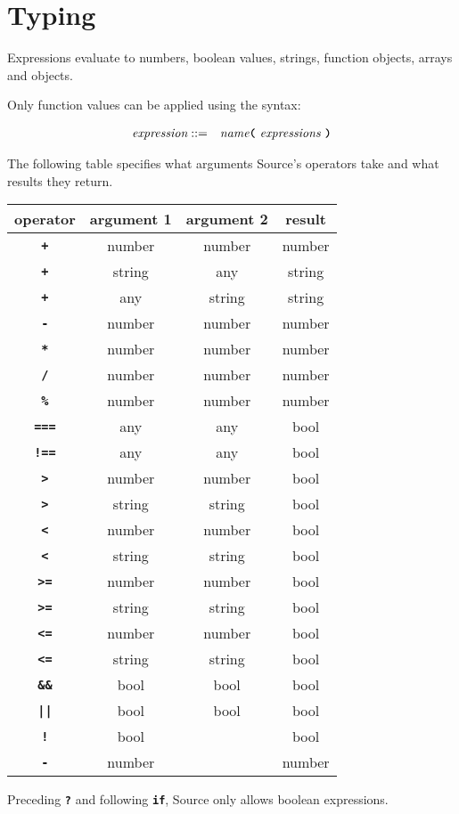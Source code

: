 
\section*{Typing}

Expressions evaluate to numbers, boolean values, strings, function objects, arrays and objects.

Only function values can be applied using the syntax:

\begin{eqnarray*}
 \textit{expression}    
                                   & ::=   &  \textit{name}
                                               \texttt{\textbf{(}}\  \textit{expressions} \
                                               \texttt{\textbf{)}}\\ 
\end{eqnarray*}

The following table specifies what arguments Source's operators
take and what results they return.

\begin{center}
\begin{tabular}{c|c|c|c}
operator & argument 1 & argument 2 & result\\ \hline
\texttt{\textbf{+}} & number   & number     & number\\
\texttt{\textbf{+}} & string   & any        & string\\
\texttt{\textbf{+}} & any      & string     & string\\
\texttt{\textbf{-}} & number   & number     & number\\
\texttt{\textbf{*}} & number   & number     & number\\
\texttt{\textbf{/}} & number   & number     & number\\
\texttt{\textbf{\%}} & number   & number     & number\\
\texttt{\textbf{===}} & any   & any     & bool\\
\texttt{\textbf{!==}} & any   & any     & bool\\
\texttt{\textbf{>}} & number   & number     & bool\\
\texttt{\textbf{>}} & string   & string     & bool\\
\texttt{\textbf{<}} & number   & number     & bool\\
\texttt{\textbf{<}} & string   & string     & bool\\
\texttt{\textbf{>=}} & number   & number     & bool\\
\texttt{\textbf{>=}} & string   & string     & bool\\
\texttt{\textbf{<=}}    & number   & number     & bool\\
\texttt{\textbf{<=}} & string   & string     & bool\\
\texttt{\textbf{\&\&}} & bool & bool & bool\\
\texttt{\textbf{||}}   & bool & bool & bool\\
\texttt{\textbf{!}}    & bool &      & bool\\
\texttt{\textbf{-}}    & number &    & number
\end{tabular}
\end{center}

Preceding \texttt{\textbf{?}} and following \texttt{\textbf{if}}, Source only allows
boolean expressions.
